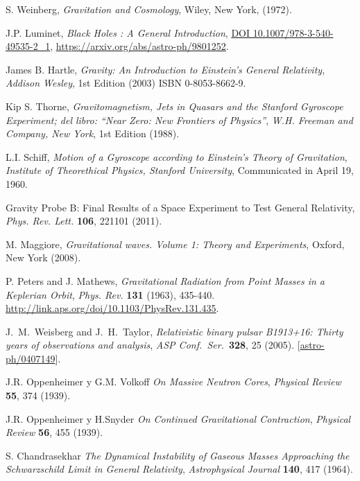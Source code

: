 \begin{thebibliography}{99}
 S. Weinberg, {\em Gravitation and Cosmology}, Wiley, New
York, (1972).

 J.P. Luminet, {\em Black Holes : A General Introduction}, \href{http://dx.doi.org/10.1007/978-3-540-49535-2\_1}{DOI 10.1007/978-3-540-49535-2\_1}, \url{https://arxiv.org/abs/astro-ph/9801252}.






James B. Hartle, {\it Gravity: An Introduction to Einstein's General Relativity},
{\sl Addison Wesley}, 1st Edition (2003) ISBN 0-8053-8662-9.

Kip S. Thorne, {\it Gravitomagnetism, Jets in Quasars and the Stanford Gyroscope Experiment; del libro: ``Near Zero: New Frontiers of Physics''},
{\sl W.H. Freeman and Company, New York}, 1st Edition (1988).

L.I. Schiff, {\it Motion of a Gyroscope according to Einstein's Theory of Gravitation},
{\sl Institute of Theorethical Physics, Stanford University}, Communicated in April 19, 1960.



Gravity Probe B: Final Results of a Space Experiment to Test General Relativity, {\it Phys. Rev. Lett.} {\bf 106}, 221101 (2011).

 M. Maggiore, {\em  Gravitational waves. Volume 1: Theory and Experiments}, Oxford, New York (2008).

P. Peters and J. Mathews, {\em Gravitational Radiation from Point Masses in a Keplerian Orbit}, {\sl Phys. Rev.} {\bf 131} (1963), 435-440. \url{http://link.aps.org/doi/10.1103/PhysRev.131.435}.

 J.~M.~Weisberg and J.~H.~Taylor, {\em Relativistic binary pulsar B1913+16: Thirty years of observations and analysis}, {\sl ASP Conf.\ Ser.}\  {\bf 328}, 25 (2005). [\href{http://arxiv.org/abs/astro-ph/0407149}{astro-ph/0407149}].

 J.R. Oppenheimer y G.M. Volkoff {\em On Massive Neutron Cores}, {\sl Physical Review} {\bf 55}, 374 (1939).

 J.R. Oppenheimer y H.Snyder {\em On Continued Gravitational Contraction}, {\sl Physical Review} {\bf 56}, 455 (1939).

 S. Chandrasekhar {\em The Dynamical Instability of Gaseous Masses Approaching the Schwarzschild Limit in General Relativity}, {\sl Astrophysical Journal} {\bf 140}, 417 (1964).


\end{thebibliography}
